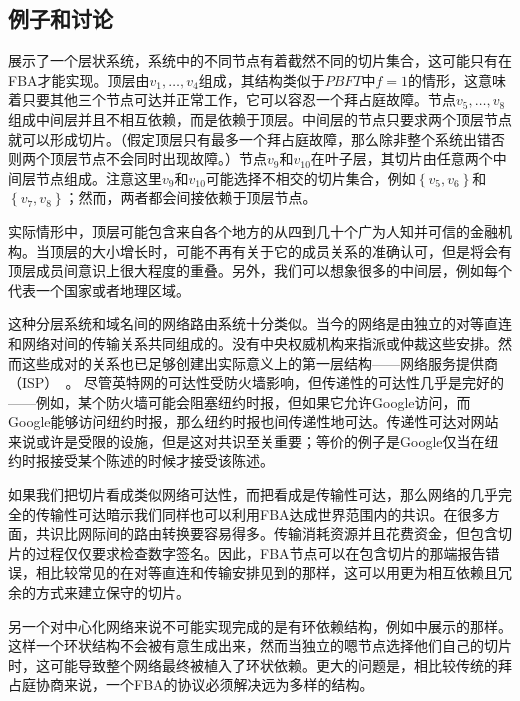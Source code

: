 \subsection{例子和讨论}
展示了一个层状系统，系统中的不同节点有着截然不同的切片集合，这可能只有在FBA才能实现。顶层由$v_1,\ldots,v_4$组成，其结构类似于$PBFT$中$f=1$的情形，这意味着只要其他三个节点可达并正常工作，它可以容忍一个拜占庭故障。节点$v_5,\ldots,v_8$组成中间层并且不相互依赖，而是依赖于顶层。中间层的节点只要求两个顶层节点就可以形成切片。（假定顶层只有最多一个拜占庭故障，那么除非整个系统出错否则两个顶层节点不会同时出现故障。）节点$v_9$和$v_10$在叶子层，其切片由任意两个中间层节点组成。注意这里$v_9$和$v_10$可能选择不相交的切片集合，例如$\left\{v_5,v_6\right\}$和$\left\{v_7,v_8\right\}$；然而，两者都会间接依赖于顶层节点。

实际情形中，顶层可能包含来自各个地方的从四到几十个广为人知并可信的金融机构。当顶层的大小增长时，可能不再有关于它的成员关系的准确认可，但是将会有顶层成员间意识上很大程度的重叠。另外，我们可以想象很多的中间层，例如每个代表一个国家或者地理区域。

这种分层系统和域名间的网络路由系统十分类似。当今的网络是由独立的对等直连和网络对间的传输关系共同组成的。没有中央权威机构来指派或仲裁这些安排。然而这些成对的关系也已足够创建出实际意义上的第一层结构——网络服务提供商（ISP）~\cite{peer_isp2010}。	尽管英特网的可达性受防火墙影响，但传递性的可达性几乎是完好的——例如，某个防火墙可能会阻塞纽约时报，但如果它允许Google访问，而Google能够访问纽约时报，那么纽约时报也间传递性地可达。传递性可达对网站来说或许是受限的设施，但是这对共识至关重要；等价的例子是Google仅当在纽约时报接受某个陈述的时候才接受该陈述。

如果我们把{\quorum}切片看成类似网络可达性，而把{\quorum}看成是传输性可达，那么网络的几乎完全的传输性可达暗示我们同样也可以利用FBA达成世界范围内的共识。在很多方面，共识比网际间的路由转换要容易得多。传输消耗资源并且花费资金，但包含切片的过程仅仅要求检查数字签名。因此，FBA节点可以在包含切片的那端报告错误，相比较常见的在对等直连和传输安排见到的那样，这可以用更为相互依赖且冗余的方式来建立保守的切片。

另一个对中心化网络来说不可能实现完成的是有环依赖结构，例如中展示的那样。这样一个环状结构不会被有意生成出来，然而当独立的嗯节点选择他们自己的切片时，这可能导致整个网络最终被植入了环状依赖。更大的问题是，相比较传统的拜占庭协商来说，一个FBA的协议必须解决远为多样的{\quorum}结构。